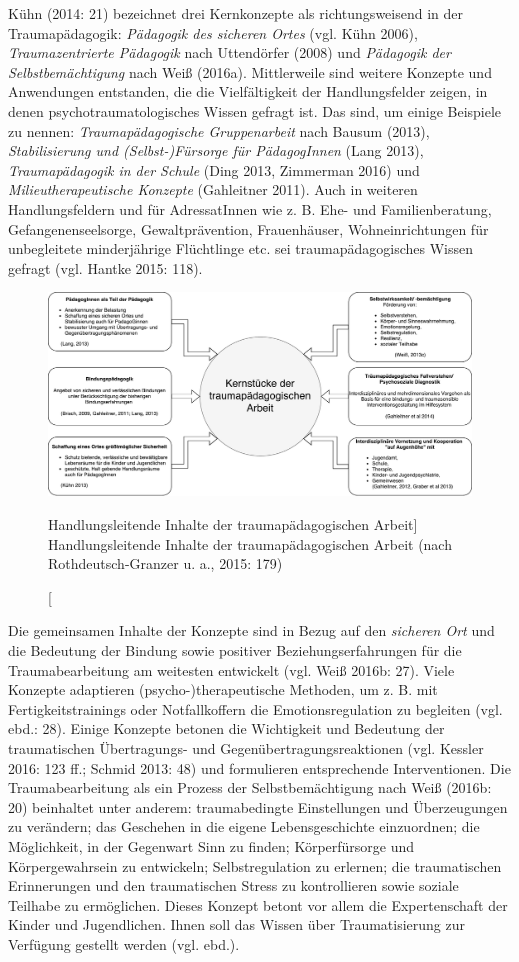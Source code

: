 Kühn (2014: 21) bezeichnet drei Kernkonzepte als richtungsweisend in der Traumap{\"a}dagogik: \textit{Pädagogik des sicheren Ortes} (vgl. Kühn 2006), \textit{Traumazentrierte Pädagogik} nach Uttendörfer (2008) und \textit{Pädagogik der Selbstbemächtigung} nach Weiß (2016a). Mittlerweile sind weitere Konzepte und Anwendungen entstanden, die die Vielfältigkeit der Handlungsfelder zeigen, in denen psychotraumatologisches Wissen gefragt ist. Das sind, um einige Beispiele zu nennen: \textit{Traumapädagogische Gruppenarbeit} nach Bausum (2013), \textit{Stabilisierung und (Selbst-)Fürsorge für PädagogInnen} (Lang 2013), \textit{Traumapädagogik in der Schule} (Ding 2013, Zimmerman 2016) und \textit{Milieutherapeutische Konzepte} (Gahleitner 2011). Auch in weiteren Handlungsfeldern und für AdressatInnen wie z. B. Ehe- und Familienberatung, Gefangenenseelsorge, Gewaltprävention, Frauenhäuser, Wohneinrichtungen für unbegleitete minderjährige Flüchtlinge etc. sei traumapädagogisches Wissen gefragt (vgl. Hantke 2015: 118).  

\begin{figure}[h]
  \centering
  \includegraphics[scale=0.45]{abbildung2}
  \caption
      [Handlungsleitende Inhalte der traumapädagogischen Arbeit]
      {Handlungsleitende Inhalte der traumapädagogischen Arbeit (nach Rothdeutsch-Granzer u. a., 2015: 179)}
  \label{fig:inhalte}
\end{figure}

Die gemeinsamen Inhalte der Konzepte sind in Bezug auf den \textit{sicheren Ort} und die Bedeutung der Bindung sowie positiver Beziehungserfahrungen für die Traumabearbeitung am weitesten entwickelt (vgl. Weiß 2016b: 27). Viele Konzepte adaptieren (psycho-)therapeutische Methoden, um z. B. mit Fertigkeitstrainings oder Notfallkoffern die Emotionsregulation zu begleiten (vgl. ebd.: 28). Einige Konzepte betonen die Wichtigkeit und Bedeutung der traumatischen Übertragungs- und Gegenübertragungsreaktionen (vgl. Kessler 2016: 123 ff.; Schmid 2013: 48) und formulieren entsprechende Interventionen. Die Traumabearbeitung als ein Prozess der Selbstbemächtigung nach Weiß (2016b: 20) beinhaltet unter anderem: traumabedingte Einstellungen und Überzeugungen zu verändern; das Geschehen in die eigene Lebensgeschichte einzuordnen; die Möglichkeit, in der Gegenwart Sinn zu finden; Körperfürsorge und Körpergewahrsein zu entwickeln; Selbstregulation zu erlernen; die traumatischen Erinnerungen und den traumatischen Stress zu kontrollieren sowie soziale Teilhabe zu ermöglichen. Dieses Konzept betont vor allem die Expertenschaft der Kinder und Jugendlichen. Ihnen soll das Wissen über Traumatisierung zur Verfügung gestellt werden (vgl. ebd.).  

